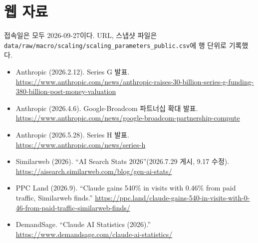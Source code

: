 \documentclass[11pt]{article}
\begin{document}
\section*{웹 자료}

접속일은 모두 2026-09-27이다. URL, 스냅샷 파일은 \texttt{data/raw/macro/scaling/scaling\_parameters\_public.csv}에 행 단위로 기록했다.
\begin{itemize}
  \item Anthropic (2026.2.12). Series G 발표. \url{https://www.anthropic.com/news/anthropic-raises-30-billion-series-g-funding-380-billion-post-money-valuation}
  \item Anthropic (2026.4.6). Google$\cdot$Broadcom 파트너십 확대 발표. \url{https://www.anthropic.com/news/google-broadcom-partnership-compute}
  \item Anthropic (2026.5.28). Series H 발표. \url{https://www.anthropic.com/news/series-h}
  \item Similarweb (2026). ``AI Search Stats 2026''(2026.7.29 게시, 9.17 수정). \url{https://aisearch.similarweb.com/blog/gen-ai-stats/}
  \item PPC Land (2026.9). ``Claude gains 540\% in visits with 0.46\% from paid traffic, Similarweb finds.'' \url{https://ppc.land/claude-gains-540-in-visits-with-0-46-from-paid-traffic-similarweb-finds/}
  \item DemandSage. ``Claude AI Statistics (2026).'' \url{https://www.demandsage.com/claude-ai-statistics/}
\end{itemize}

\printbibliography[title={참고문헌}]
\end{document}

